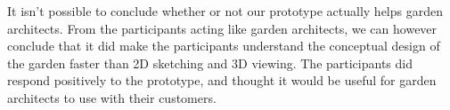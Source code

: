 It isn't possible to conclude whether or not our prototype actually helps garden architects. From the participants acting like garden architects, we can however conclude that it did make the participants understand the conceptual design of the garden faster than 2D sketching and 3D viewing. The participants did respond positively to the prototype, and thought it would be useful for garden architects to use with their customers.

